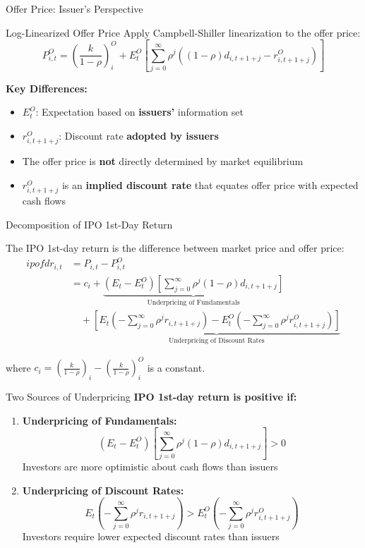 \documentclass{beamer}
\begin{document}
\begin{frame}{Offer Price: Issuer's Perspective}
\begin{block}{Log-Linearized Offer Price}
Apply Campbell-Shiller linearization to the offer price:
\[
P_{i,t}^O = \left(\frac{k}{1-\rho}\right)_i^O + E_t^O\left[\sum_{j=0}^{\infty}\rho^j\left((1-\rho)d_{i,t+1+j} - r_{i,t+1+j}^O\right)\right]
\]
\end{block}

\textbf{Key Differences:}
\begin{itemize}
    \item $E_t^O$: Expectation based on \textbf{issuers'} information set
    \item $r_{i,t+1+j}^O$: Discount rate \textbf{adopted by issuers}
    \item The offer price is \textbf{not} directly determined by market equilibrium
    \item $r_{i,t+1+j}^O$ is an \textbf{implied discount rate} that equates offer price with expected cash flows
\end{itemize}
\end{frame}

\begin{frame}[allowframebreaks]{Decomposition of IPO 1st-Day Return}

The IPO 1st-day return is the difference between market price and offer price:
\begin{align*}
ipofdr_{i,t} &= P_{i,t} - P_{i,t}^O \\[8pt]
&= c_i + \underbrace{\left(E_t - E_t^O\right)\left[\sum_{j=0}^{\infty}\rho^j(1-\rho)d_{i,t+1+j}\right]}_{\text{Underpricing of Fundamentals}}\\[8pt]
&\quad + \underbrace{\left[E_t\left(-\sum_{j=0}^{\infty}\rho^j r_{i,t+1+j}\right) - E_t^O\left(-\sum_{j=0}^{\infty}\rho^j r_{i,t+1+j}^O\right)\right]}_{\text{Underpricing of Discount Rates}}
\end{align*}

where $c_i = \left(\frac{k}{1-\rho}\right)_i - \left(\frac{k}{1-\rho}\right)_i^O$ is a constant.
\end{frame}


\begin{frame}{Two Sources of Underpricing}
\textbf{IPO 1st-day return is positive if:}


\begin{enumerate}
    \item \textbf{Underpricing of Fundamentals:}
    \[
    \left(E_t - E_t^O\right)\left[\sum_{j=0}^{\infty}\rho^j(1-\rho)d_{i,t+1+j}\right] > 0
    \]
    Investors are more optimistic about cash flows than issuers
    
    \vspace{0.5cm}
    \item \textbf{Underpricing of Discount Rates:}
    \[
    E_t\left(-\sum_{j=0}^{\infty}\rho^j r_{i,t+1+j}\right) > E_t^O\left(-\sum_{j=0}^{\infty}\rho^j r_{i,t+1+j}^O\right)
    \]
    Investors require lower expected discount rates than issuers
\end{enumerate}
\end{frame}
\end{document}
